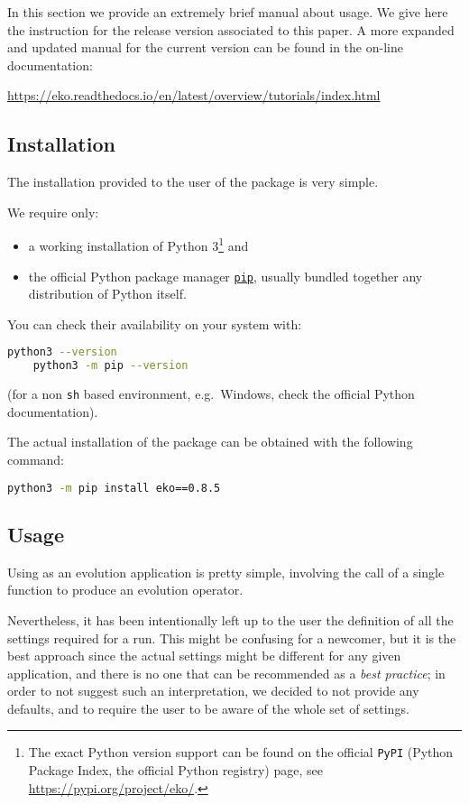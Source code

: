 In this section we provide an extremely brief manual about \eko{} usage.
We give here the instruction for the release version associated to this paper.
A more expanded and updated manual for the current version can be found in the on-line documentation:

\begin{center}
\url{https://eko.readthedocs.io/en/latest/overview/tutorials/index.html}
\end{center}

\subsection{Installation}

The installation provided to the user of the package is very simple.

We require only:
\begin{itemize}
    \item a working installation of Python 3\footnote{
            The exact Python version support can be found on the official
            \texttt{PyPI} (Python Package Index, the official Python registry)
            \eko{} page, see \url{https://pypi.org/project/eko/}.
        } and
    \item the official Python package manager
        \href{https://pip.pypa.io/}{\texttt{pip}}, usually bundled together any
        distribution of Python itself.
\end{itemize} 
You can check their availability on your system with:
\begin{lstlisting}[language=sh]
    python3 --version
    python3 -m pip --version
\end{lstlisting}
(for a non \texttt{sh} based environment, e.g.\ Windows, check the official
Python documentation).

The actual installation of the package can be obtained with the following
command:
\begin{lstlisting}[language=sh]
    python3 -m pip install eko==0.8.5
\end{lstlisting}

\subsection{Usage}

Using \eko{} as an evolution application is pretty simple, involving the call
of a single function to produce an evolution operator.

Nevertheless, it has been intentionally left up to the user the definition of
all the settings required for a run.
This might be confusing for a newcomer, but it is the best approach since the
actual settings might be different for any given application, and there is no
one that can be recommended as a \textit{best practice}; in order to not suggest
such an interpretation, we decided to not provide any defaults, and to require
the user to be aware of the whole set of settings.

